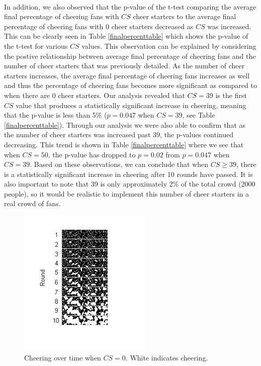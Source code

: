 \documentclass[oneside,12pt]{report}
\begin{document}
\paragraph{}
In addition, we also observed that the p-value of the t-test comparing the average final percentage of cheering fans with $CS$ cheer starters to the average final percentage of cheering fans with 0 cheer starters decreased as $CS$ was increased. This can be clearly seen in Table \ref{finalpercenttable} which shows the p-value of the t-test for various $CS$ values. This observation can be explained by considering the postive relationship between average final percentage of cheering fans and the number of cheer starters that was previously detailed. As the number of cheer starters increases, the average final percentage of cheering fans increases as well and thus the percentage of cheering fans becomes more significant as compared to when there are 0 cheer starters. Our analysis revealed that $CS=39$ is the first $CS$ value that produces a statistically significant increase in cheering, meaning that the p-value is less than 5\% ($p=0.047$ when $CS=39$, see Table \ref{finalpercenttable}). Through our analysis we were also able to confirm that as the number of cheer starters was increased past 39, the p-values continued decreasing. This trend is shown in Table \ref{finalpercenttable} where we see that when $CS=50$, the p-value has dropped to $p=0.02$ from $p=0.047$ when $CS=39$. Based on these observations, we can conclude that when $CS\geq39$, there is a statistically significant increase in cheering after 10 rounds have passed. It is also important to note that 39 is only approximately 2\% of the total crowd (2000 people), so it would be realistic to implement this number of cheer starters in a real crowd of fans. 

\begin{figure}[h!]
    		\begin{center}
    		  \includegraphics [width=2.5in] {n=0,46.jpg}
    			\caption [Pictorial Representation of Cheering Over Time with 0 Cheer Starters] {Cheering over time when $CS=0$. White indicates cheering.}
    			\label{cs0hist}
    			\end{center}
 \end{figure}
 
\end{document}
